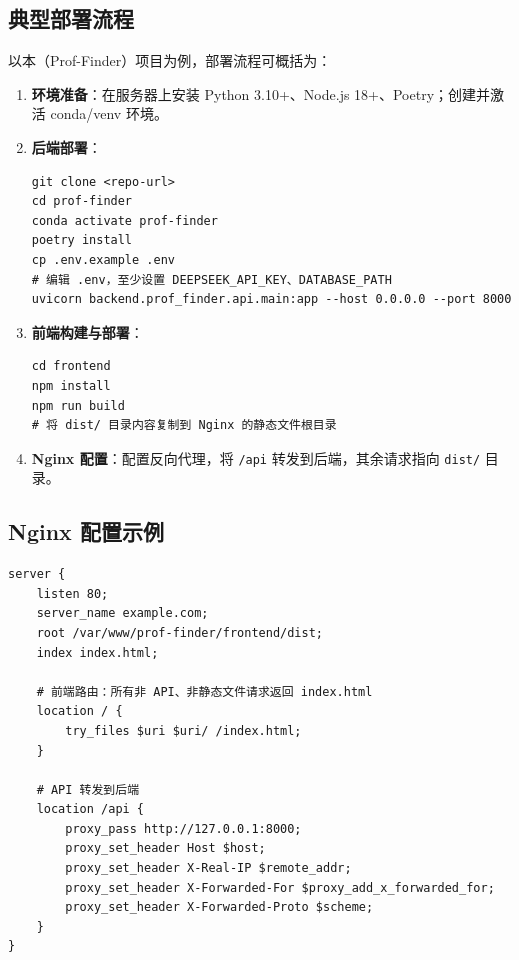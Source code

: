 \documentclass[11pt]{article}
\begin{document}
\subsection{典型部署流程}

以本（Prof-Finder）项目为例，部署流程可概括为：

\begin{enumerate}
    \item \textbf{环境准备}：在服务器上安装 Python 3.10+、Node.js 18+、Poetry；创建并激活 conda/venv 环境。

    \item \textbf{后端部署}：
    \begin{lstlisting}[caption=后端部署步骤]
git clone <repo-url>
cd prof-finder
conda activate prof-finder
poetry install
cp .env.example .env
# 编辑 .env，至少设置 DEEPSEEK_API_KEY、DATABASE_PATH
uvicorn backend.prof_finder.api.main:app --host 0.0.0.0 --port 8000
    \end{lstlisting}

    \item \textbf{前端构建与部署}：
    \begin{lstlisting}[caption=前端构建与部署]
cd frontend
npm install
npm run build
# 将 dist/ 目录内容复制到 Nginx 的静态文件根目录
    \end{lstlisting}

    \item \textbf{Nginx 配置}：配置反向代理，将 \texttt{/api} 转发到后端，其余请求指向 \texttt{dist/} 目录。
\end{enumerate}

\subsection{Nginx 配置示例}

\begin{lstlisting}[caption=简化版 Nginx 配置]
server {
    listen 80;
    server_name example.com;
    root /var/www/prof-finder/frontend/dist;
    index index.html;

    # 前端路由：所有非 API、非静态文件请求返回 index.html
    location / {
        try_files $uri $uri/ /index.html;
    }

    # API 转发到后端
    location /api {
        proxy_pass http://127.0.0.1:8000;
        proxy_set_header Host $host;
        proxy_set_header X-Real-IP $remote_addr;
        proxy_set_header X-Forwarded-For $proxy_add_x_forwarded_for;
        proxy_set_header X-Forwarded-Proto $scheme;
    }
}
\end{lstlisting}
\end{document}
